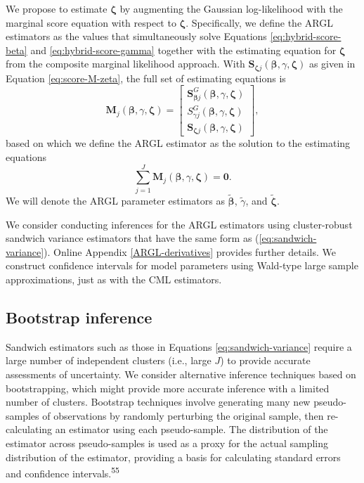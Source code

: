 \documentclass[
  american,
  man, donotrepeattitle,floatsintext]{apa7}
\begin{document}
We propose to estimate \(\boldsymbol\zeta\) by augmenting the Gaussian log-likelihood with the marginal score equation with respect to \(\boldsymbol\zeta\).
Specifically, we define the ARGL estimators as the values that simultaneously solve Equations \eqref{eq:hybrid-score-beta} and \eqref{eq:hybrid-score-gamma} together with the estimating equation for \(\boldsymbol\zeta\) from the composite marginal likelihood approach.
With \(\mathbf{S}_{\boldsymbol\zeta j}\left(\boldsymbol{\beta}, \gamma, \boldsymbol{\zeta}\right)\) as given in Equation \eqref{eq:score-M-zeta}, the full set of estimating equations is
\begin{equation}
\label{eq:hybrid-score}
\mathbf{M}_j(\boldsymbol\beta, \gamma, \boldsymbol\zeta) = \left[\begin{array}{c} \mathbf{S}^G_{\boldsymbol\beta j}(\boldsymbol\beta, \gamma, \boldsymbol\zeta) \\ S^G_{\gamma j}(\boldsymbol\beta, \gamma, \boldsymbol\zeta) \\ \mathbf{S}_{\boldsymbol\zeta j}(\boldsymbol\beta, \gamma, \boldsymbol\zeta) \end{array}\right],
\end{equation}
based on which we define the ARGL estimator as the solution to the estimating equations
\begin{equation}
\label{eq:hybrid-total-score}
\sum_{j=1}^J \mathbf{M}_j(\boldsymbol\beta, \gamma, \boldsymbol\zeta) = \mathbf{0}.
\end{equation}
We will denote the ARGL parameter estimators as \(\boldsymbol{\tilde\beta}\), \(\tilde\gamma\), and \(\boldsymbol{\tilde\zeta}\).

We consider conducting inferences for the ARGL estimators using cluster-robust sandwich variance estimators that have the same form as (\ref{eq:sandwich-variance}).
Online Appendix \ref{ARGL-derivatives} provides further details.
We construct confidence intervals for model parameters using Wald-type large sample approximations, just as with the CML estimators.

\subsection{Bootstrap inference}\label{bootstrap-inference}

Sandwich estimators such as those in Equations \eqref{eq:sandwich-variance} require a large number of independent clusters (i.e., large \(J\)) to provide accurate assessments of uncertainty.
We consider alternative inference techniques based on bootstrapping, which might provide more accurate inference with a limited number of clusters.
Bootstrap techniques involve generating many new pseudo-samples of observations by randomly perturbing the original sample, then re-calculating an estimator using each pseudo-sample.
The distribution of the estimator across pseudo-samples is used as a proxy for the actual sampling distribution of the estimator, providing a basis for calculating standard errors and confidence intervals.\textsuperscript{55}
\end{document}
